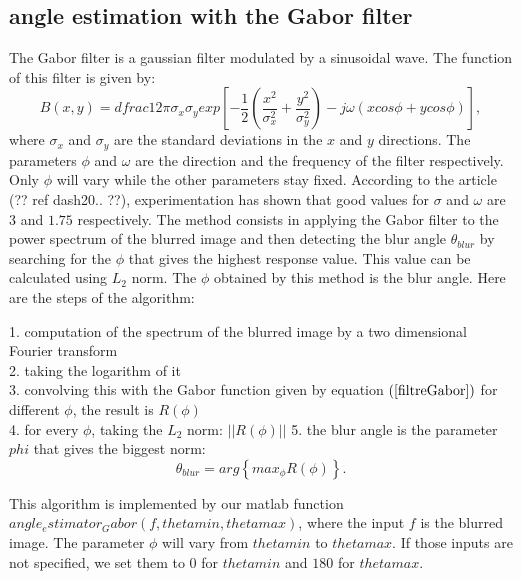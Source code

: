 \subsection{angle estimation with the Gabor filter}

The Gabor filter is a gaussian filter modulated by a sinusoidal wave. The function of this filter is given by:
\begin{equation}
B(x,y)=dfrac{1}{2\pi \sigma_x \sigma_y} exp\left[-\frac{1}{2}\left(\frac{x^2}{\sigma_x^2}+ \frac{y^2}{\sigma_y^2} \right) -j\omega(xcos\phi + ycos\phi)\right],
\label{filtreGabor}
\end{equation}
where $\sigma_x$ and $\sigma_y$ are the standard deviations in the $x$ and $y$ directions. The parameters $\phi$ and $\omega$ are the direction and the frequency of the filter respectively. Only $\phi$ will vary while the other parameters stay fixed. According to the article (?? ref dash20.. ??), experimentation has shown that good values for $\sigma$ and $\omega$ are $3$ and $1.75$ respectively. The method consists in applying the Gabor filter to the power spectrum of the blurred image and then detecting the blur angle $\theta_{blur}$ by searching for the $\phi$ that gives the highest response value. This value can be calculated using $L_2$ norm. The $\phi$ obtained by this method is the blur angle. Here are the steps of the algorithm:

1. computation of the spectrum of the blurred image by a two dimensional Fourier transform\\
2. taking the logarithm of it\\
3. convolving this with the Gabor function given by equation $(\ref{filtreGabor})$ for different $\phi$, the result is $R(\phi)$\\
4. for every $\phi$, taking the $L_2$ norm: $||R(\phi)||$
5. the blur angle is the parameter $phi$ that gives the biggest norm:
\begin{equation}
\theta_{blur} = arg \left\lbrace max_{\phi}R(\phi)\right\rbrace.
\end{equation}

This algorithm is implemented by our matlab function $angle_estimator_Gabor(f,thetamin, thetamax)$, where the input $f$ is the blurred image. The parameter $\phi$ will vary from $thetamin$ to $thetamax$. If those inputs are not specified, we set them to $0$ for $thetamin$ and $180$ for $thetamax$.


